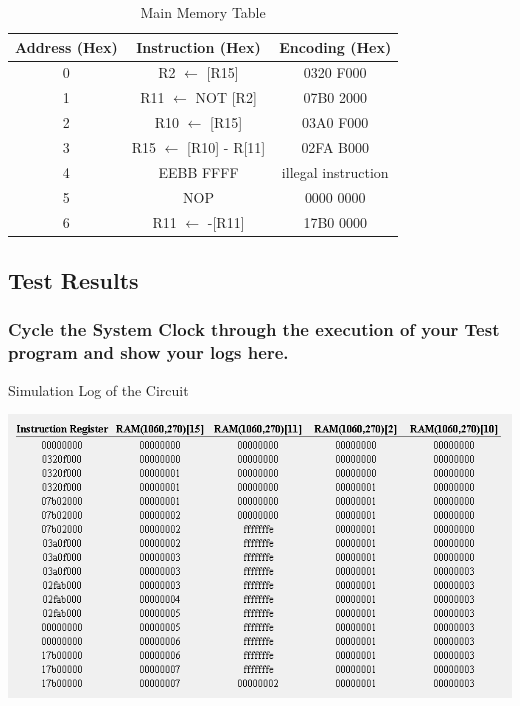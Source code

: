 \documentclass{article}
\begin{document}
	\begin{table}[!ht]
		\centering
		\caption{Main Memory Table}
		\vspace{0.2cm}
		\begin{tabular}{|c|c|c|}
			\hline
			Address (Hex) & Instruction (Hex) & Encoding (Hex)\\
			\hline\hline
			0 & R2 $\leftarrow$ [R15] & 0320 F000\\
			\hline
			1 & R11 $\leftarrow$ NOT [R2] & 07B0 2000\\
			\hline
			2 & R10 $\leftarrow$ [R15] & 03A0 F000\\
			\hline
			3 & R15 $\leftarrow$ [R10] - R[11] & 02FA B000\\
			\hline
			4 & EEBB FFFF & illegal instruction\\
			\hline
			5 & NOP & 0000 0000\\
			\hline
			6 & R11 $\leftarrow$ -[R11] & 17B0 0000\\
			\hline
		\end{tabular}
	\end{table}

	\pagebreak

	\subsection{Test Results}
	\subsubsection{Cycle the System Clock through the execution of your Test program and show your logs here.}
	\begin{table}[!ht]
		\centering
		\caption{Simulation Log of the Circuit}
		\vspace{0.2cm}
		\includegraphics[width=\linewidth]{sim_log_table.png}
	\end{table}
\end{document}
